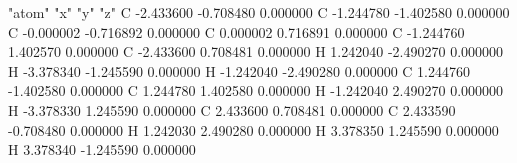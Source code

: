 "atom" "x" "y" "z"
C -2.433600 -0.708480 0.000000
C -1.244780 -1.402580 0.000000
C -0.000002 -0.716892 0.000000
C 0.000002 0.716891 0.000000
C -1.244760 1.402570 0.000000
C -2.433600 0.708481 0.000000
H 1.242040 -2.490270 0.000000
H -3.378340 -1.245590 0.000000
H -1.242040 -2.490280 0.000000
C 1.244760 -1.402580 0.000000
C 1.244780 1.402580 0.000000
H -1.242040 2.490270 0.000000
H -3.378330 1.245590 0.000000
C 2.433600 0.708481 0.000000
C 2.433590 -0.708480 0.000000
H 1.242030 2.490280 0.000000
H 3.378350 1.245590 0.000000
H 3.378340 -1.245590 0.000000
